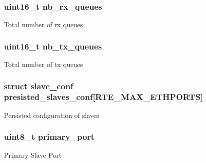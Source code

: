 \subsubsection[{nb\+\_\+rx\+\_\+queues}]{\setlength{\rightskip}{0pt plus 5cm}uint16\+\_\+t nb\+\_\+rx\+\_\+queues}\label{structbond__dev__private_ae6fa0630eafe59d603f1ed9123dcc7fe}
Total number of rx queues \hypertarget{structbond__dev__private_a3dc35933233d56e550e5914aad387408}{}
\subsubsection[{nb\+\_\+tx\+\_\+queues}]{\setlength{\rightskip}{0pt plus 5cm}uint16\+\_\+t nb\+\_\+tx\+\_\+queues}\label{structbond__dev__private_a3dc35933233d56e550e5914aad387408}
Total number of tx queues \hypertarget{structbond__dev__private_aa082a5fca72edb6b65579350f9ee6cec}{}
\subsubsection[{presisted\+\_\+slaves\+\_\+conf}]{\setlength{\rightskip}{0pt plus 5cm}struct {\bf slave\+\_\+conf} presisted\+\_\+slaves\+\_\+conf\mbox{[}R\+T\+E\+\_\+\+M\+A\+X\+\_\+\+E\+T\+H\+P\+O\+R\+T\+S\mbox{]}}\label{structbond__dev__private_aa082a5fca72edb6b65579350f9ee6cec}
Persisted configuration of slaves \hypertarget{structbond__dev__private_ae340e5cdcbe69229f5806f0cabcb07d0}{}
\subsubsection[{primary\+\_\+port}]{\setlength{\rightskip}{0pt plus 5cm}uint8\+\_\+t primary\+\_\+port}\label{structbond__dev__private_ae340e5cdcbe69229f5806f0cabcb07d0}
Primary Slave Port \hypertarget{structbond__dev__private_a1116c885f822943f992ed455f278671e}{}
